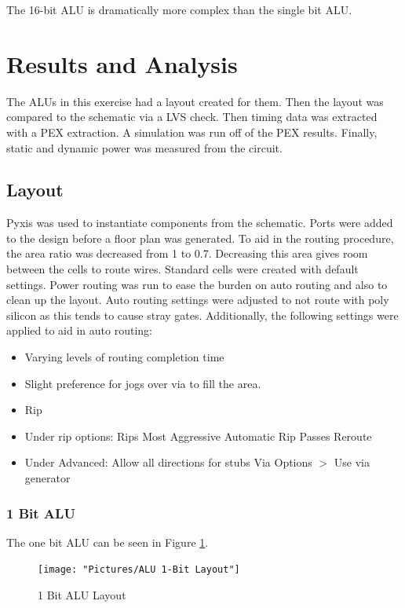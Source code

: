 \documentclass[11pt]{article}
\begin{document}
			The 16-bit ALU is dramatically more complex than the single bit ALU.

\section{Results and Analysis}
		
	The ALUs in this exercise had a layout created for them. Then the layout was compared to the schematic via a LVS check. Then timing data was extracted with a PEX extraction. A simulation was run off of the PEX results. Finally, static and dynamic power was measured from the circuit.
		
	\subsection{Layout}
		
		Pyxis was used to instantiate components from the schematic. Ports were added to the design before a floor plan was generated. To aid in the routing procedure, the area ratio was decreased from 1 to 0.7. Decreasing this area gives room between the cells to route wires. Standard cells were created with default settings. Power routing was run to ease the burden on auto routing and also to clean up the layout. Auto routing settings were adjusted to not route with poly silicon as this tends to cause stray gates. Additionally, the following settings were applied to aid in auto routing:
		\begin{itemize}
			\item Varying levels of routing completion time
			\item Slight preference for jogs over via to fill the area.
			\item Rip
			\item Under rip options: 
			\subitem Rips Most Aggressive
			\subitem Automatic Rip Passes
			\subitem Reroute
			\item Under Advanced:
			\subitem Allow all directions for stubs
			\subitem Via Options $>$ Use via generator
		\end{itemize}
	
		\subsubsection{1 Bit ALU}
		
			The one bit ALU can be seen in Figure \ref{fig:alu-1bit-layout}.
		
			\begin{figure}[H]
				\centering
				\texttt{[image: "Pictures/ALU 1-Bit Layout"]}
				\caption{1 Bit ALU Layout}
				\label{fig:alu-1bit-layout}
			\end{figure}
			
\end{document}
